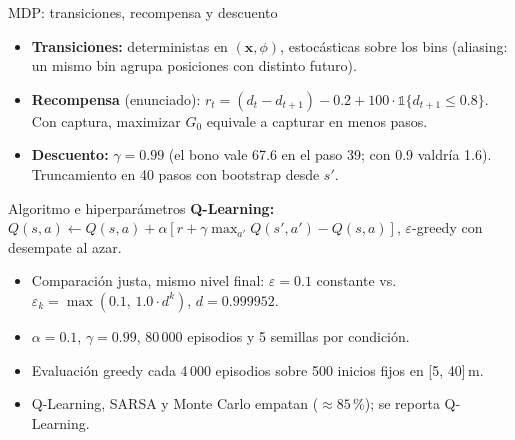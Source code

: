 \documentclass[10pt]{beamer}
\begin{document}
\begin{frame}{MDP: transiciones, recompensa y descuento}
    \begin{itemize}
        \item \textbf{Transiciones:} deterministas en $(\mathbf{x}, \phi)$, estocásticas sobre los bins
        (aliasing: un mismo bin agrupa posiciones con distinto futuro).
        \item \textbf{Recompensa} (enunciado):
        $r_t = (d_t - d_{t+1}) - 0.2 + 100 \cdot \mathbb{1}\{d_{t+1} \le 0.8\}$.
        Con captura, maximizar $G_0$ equivale a capturar en menos pasos.
        \item \textbf{Descuento:} $\gamma = 0.99$ (el bono vale 67.6 en el paso 39; con 0.9 valdría 1.6).
        Truncamiento en 40 pasos con bootstrap desde $s'$.
    \end{itemize}
\end{frame}

\begin{frame}{Algoritmo e hiperparámetros}
    \textbf{Q-Learning:} $Q(s,a) \leftarrow Q(s,a) + \alpha[r + \gamma \max_{a'} Q(s',a') - Q(s,a)]$,
    $\varepsilon$-greedy con desempate al azar.
    \begin{itemize}
        \item Comparación justa, mismo nivel final: $\varepsilon = 0.1$ constante vs.\
        $\varepsilon_k = \max(0.1,\, 1.0 \cdot d^k)$, $d = 0.999952$.
        \item $\alpha = 0.1$, $\gamma = 0.99$, 80\,000 episodios y 5 semillas por condición.
        \item Evaluación greedy cada 4\,000 episodios sobre 500 inicios fijos en [5, 40]\,m.
        \item Q-Learning, SARSA y Monte Carlo empatan ($\approx 85$\,\%); se reporta Q-Learning.
    \end{itemize}
\end{frame}
\end{document}
